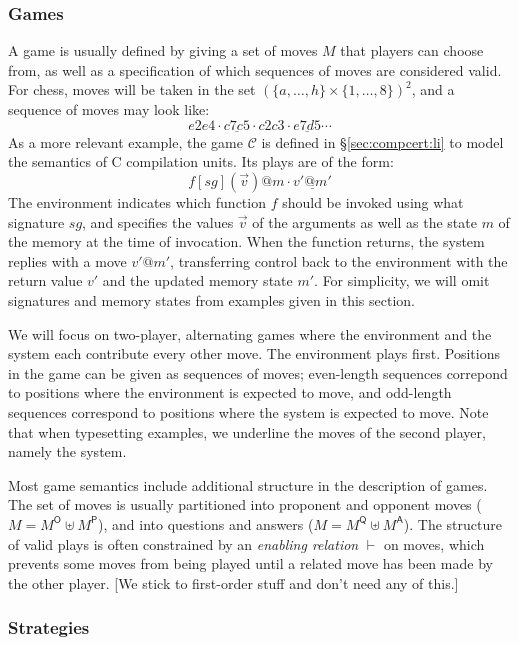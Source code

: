 \documentclass[acmsmall,timestamp,review]{acmart}
\newcommand{\kw}[1]{\ensuremath{ \mathsf{#1} }}
\begin{document}

\subsubsection{Games} %

A game is usually defined by giving a set of moves $M$
that players can choose from,
as well as a specification of which
sequences of moves are considered valid.
For chess,
moves will be taken in the set $(\{a, \ldots, h\} \times \{1, \ldots, 8\})^2$,
and a sequence of moves may look like:
\[ e2e4 \cdot \underline{c7c5} \cdot c2c3 \cdot \underline{e7d5} \cdots \]
As a more relevant example,
the game $\mathcal{C}$ is defined in \S\ref{sec:compcert:li}
to model the semantics of C compilation units.
Its plays are of the form:
\[ f[sg](\vec{v})@m \cdot \underline{v'@m'} \]
The environment indicates
which function $f$ should be invoked
using what signature $sg$,
and specifies the values $\vec{v}$ of the arguments
as well as the state $m$ of the memory
at the time of invocation.
When the function returns,
the system replies with a move $v'@m'$,
transferring control back to the environment
with the return value $v'$
and the updated memory state $m'$.
For simplicity,
we will omit signatures and memory states
from examples given in this section.

We will focus on two-player, alternating games
where the environment and the system each contribute every other move.
The environment plays first.
Positions in the game can be given
as sequences of moves;
even-length sequences correpond to positions
where the environment is expected to move,
and odd-length sequences correspond to positions
where the system is expected to move.
Note that when typesetting examples,
we underline the moves of the second player,
namely the system.

Most game semantics
include additional structure
in the description of games.
The set of moves is usually partitioned
into proponent and opponent moves ($M = M^\kw{O} \uplus M^\kw{P}$),
and into questions and answers ($M = M^\kw{Q} \uplus M^\kw{A}$).
The structure of valid plays
is often constrained by an \emph{enabling relation} $\vdash$
on moves,
which prevents some moves from being played
until a related move has been made by the other player.
[We stick to first-order stuff and don't need any of this.]


\subsubsection{Strategies} %
\end{document}
